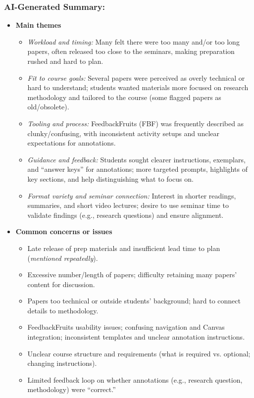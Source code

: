 \documentclass[a4paper]{report}
\begin{document}
\subsubsection{AI-Generated Summary:}

\begin{itemize}
\item \textbf{Main themes}
  \begin{itemize}
    \item \textit{Workload and timing:} Many felt there were too many and/or too long papers, often released too close to the seminars, making preparation rushed and hard to plan.
    \item \textit{Fit to course goals:} Several papers were perceived as overly technical or hard to understand; students wanted materials more focused on research methodology and tailored to the course (some flagged papers as old/obsolete).
    \item \textit{Tooling and process:} FeedbackFruits (FBF) was frequently described as clunky/confusing, with inconsistent activity setups and unclear expectations for annotations.
    \item \textit{Guidance and feedback:} Students sought clearer instructions, exemplars, and “answer keys” for annotations; more targeted prompts, highlights of key sections, and help distinguishing what to focus on.
    \item \textit{Format variety and seminar connection:} Interest in shorter readings, summaries, and short video lectures; desire to use seminar time to validate findings (e.g., research questions) and ensure alignment.
  \end{itemize}

\item \textbf{Common concerns or issues}
  \begin{itemize}
    \item Late release of prep materials and insufficient lead time to plan (\textit{mentioned repeatedly}).
    \item Excessive number/length of papers; difficulty retaining many papers’ content for discussion.
    \item Papers too technical or outside students’ background; hard to connect details to methodology.
    \item FeedbackFruits usability issues; confusing navigation and Canvas integration; inconsistent templates and unclear annotation instructions.
    \item Unclear course structure and requirements (what is required vs. optional; changing instructions).
    \item Limited feedback loop on whether annotations (e.g., research question, methodology) were “correct.”
  \end{itemize}


\end{itemize}
\end{document}
